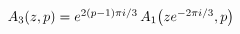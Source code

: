 $\mathop{A_{3}\/}\nolimits\!\left(z,p\right)=e^{2(p-1)\pi i/3}\mathop{A_{1}\/}%
\nolimits\!\left(ze^{-2\pi i/3},p\right)$